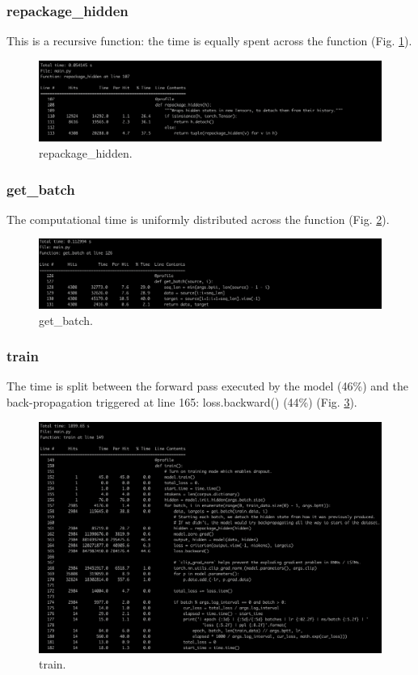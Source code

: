 \documentclass[11pt]{article}
\newcommand{\0}{\mat{0}}
\begin{document}
\begin{itemize}
   \subsubsection*{repackage\_hidden}
   This is a recursive function: the time is equally spent across the function  (Fig. \ref{fig:repackagehidden}).
    \begin{figure}[ht!]
         \centering
 	 \includegraphics[width=\linewidth]{repackageHidden.png}
 	 \caption{repackage\_hidden.}
 	 \label{fig:repackagehidden}
   \end{figure}
   
   \subsubsection*{get\_batch}
   The computational time is uniformly distributed across the function (Fig. \ref{fig:getbatch}).
   \begin{figure}[ht!]
  	\centering
 	 \includegraphics[width=\linewidth]{getBatch.png}
 	 \caption{get\_batch.}
 	 \label{fig:getbatch}
   \end{figure}

   \subsubsection*{train}
   The time is split between the forward pass executed by the model (46\%) and the back-propagation triggered at line 165: loss.backward() (44\%) (Fig. \ref{fig:train}).
   \begin{figure}[ht!]
  	\centering
 	 \includegraphics[width=\linewidth]{train.png}
 	 \caption{train.}
 	 \label{fig:train}
   \end{figure}



\end{itemize}
\end{document}
